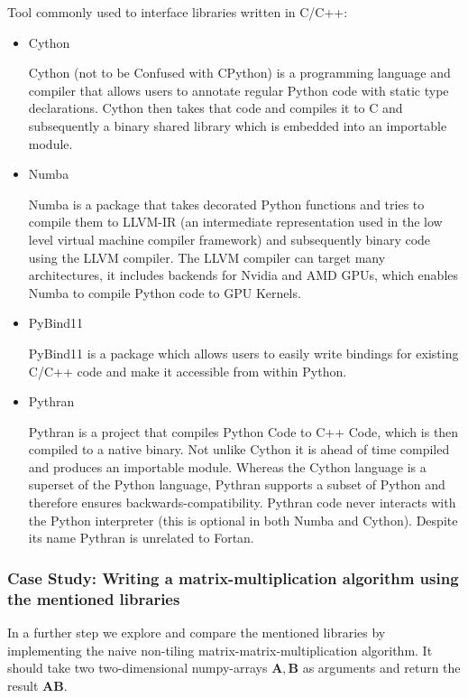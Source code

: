 \documentclass[english,11pt,a4paper,table]{article} %
\begin{document}
Tool commonly used to interface libraries written in C/C++:
\begin{itemize}
	\item {Cython \cite{cython}

	      Cython (not to be Confused with CPython) is a programming language and compiler that allows users to annotate regular Python code with static type declarations.
	      Cython then takes that code and compiles it to C and subsequently a binary shared library which is embedded into an importable module.}
	\item {Numba \cite{lam2015numba}

	      Numba is a package that takes decorated Python functions and tries to compile them to LLVM-IR (an intermediate representation used in the low level virtual machine compiler framework) and subsequently binary code using the LLVM compiler.\cite{llvm}
	      The LLVM compiler can target many architectures, it includes backends for Nvidia and AMD GPUs, which enables Numba to compile Python code to GPU Kernels.
	      }
	\item {PyBind11 \cite{pybind11}

	      PyBind11 is a package which allows users to easily write bindings for existing C/C++ code and make it accessible from within Python.
	      }
	\item {Pythran \cite{guelton2015pythran}

	      Pythran is a project that compiles Python Code to  C++ Code, which is then compiled to a native binary. Not unlike Cython it is ahead of time compiled and produces an importable module.
	      Whereas the Cython language is a superset of the Python language, Pythran supports a subset of Python and therefore ensures backwards-compatibility.
	      Pythran code never interacts with the Python interpreter (this is optional in both Numba and Cython).
	      Despite its name Pythran is unrelated to Fortan.
	      }
\end{itemize}

\subsubsection{Case Study: Writing a matrix-multiplication algorithm using the mentioned libraries}

In a further step we explore and compare the mentioned libraries by implementing the naive non-tiling matrix-matrix-multiplication algorithm.
It should take two two-dimensional numpy-arrays $\mathbf{A}, \mathbf{B}$ as arguments and return the result $\mathbf{A}\mathbf{B}$.
\end{document}
